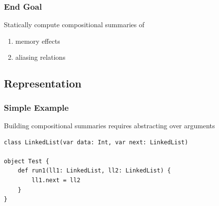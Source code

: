 \documentclass[hyperref={pdfpagelabels=false}]{beamer}
\begin{document}
\begin{frame}
\frametitle{End Goal}
    Statically compute compositional summaries of
    \begin{enumerate}
        \item memory effects
        \item aliasing relations
    \end{enumerate}
\end{frame}

\subsection{Representation}

\begin{frame}[fragile]
\frametitle{Simple Example}

    Building compositional summaries requires abstracting over arguments

\begin{lstlisting}
class LinkedList(var data: Int, var next: LinkedList)

object Test {
    def run1(ll1: LinkedList, ll2: LinkedList) {
        ll1.next = ll2
    }
}
\end{lstlisting}
\end{frame}
\end{document}
